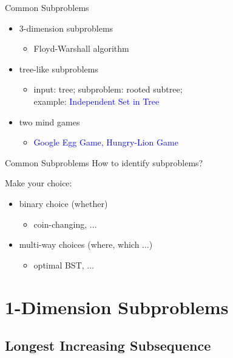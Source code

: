 \documentclass{beamer}
\begin{document}
\begin{frame}{Common Subproblems}
  \begin{itemize}
    \setlength{\itemsep}{8pt}
    \item 3-dimension subproblems
      \begin{itemize}
        \item Floyd-Warshall algorithm
      \end{itemize}
    \item tree-like subproblems
      \begin{itemize}
        \item input: tree;
          subproblem: rooted subtree;  \\
          example: \textcolor{blue}{Independent Set in Tree}
      \end{itemize}
    \item two mind games
      \begin{itemize}
        \item \textcolor{blue}{Google Egg Game, Hungry-Lion Game}
      \end{itemize}
  \end{itemize}
\end{frame}
\begin{frame}{Common Subproblems}
  How to identify subproblems?
  \vspace{0.50cm}
  \begin{mdframed}
    \centering
    Make your choice:
    \begin{itemize}
      \item binary choice (whether)
        \begin{itemize}
          \item coin-changing, $\ldots$
        \end{itemize}
      \item multi-way choices (where, which $\ldots$)
        \begin{itemize}
          \item optimal BST, $\ldots$
        \end{itemize}
    \end{itemize}
  \end{mdframed}
\end{frame}
\section{1-Dimension Subproblems}

\subsection{Longest Increasing Subsequence}
\end{document}
